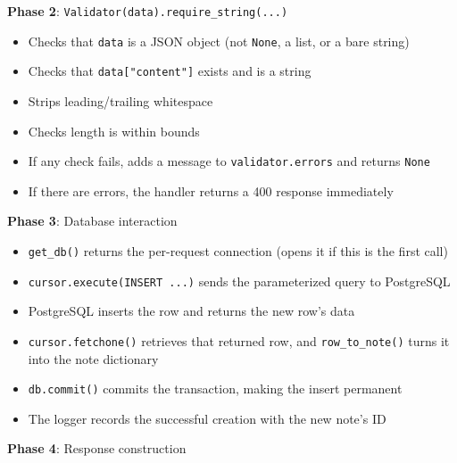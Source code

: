 \noindent{}\textbf{Phase 2}: \texttt{Validator(data).}\allowbreak{}\texttt{require\_}\allowbreak{}\texttt{string(.}\allowbreak{}\texttt{.}\allowbreak{}\texttt{.}\allowbreak{}\texttt{)}

\begin{itemize}
\tightlist
\item
  Checks that \texttt{data} is a JSON object (not \texttt{None}, a list, or a bare string)
\item
  Checks that \texttt{data{[}"content"{]}} exists and is a string
\item
  Strips leading/trailing whitespace
\item
  Checks length is within bounds
\item
  If any check fails, adds a message to \texttt{validator.errors} and returns \texttt{None}
\item
  If there are errors, the handler returns a 400 response immediately
\end{itemize}

\noindent{}\textbf{Phase 3}: Database interaction

\begin{itemize}
\tightlist
\item
  \texttt{get\_db()} returns the per-request connection (opens it if this is the first call)
\item
  \texttt{cursor.}\allowbreak{}\texttt{execute(INSERT\ .}\allowbreak{}\texttt{.}\allowbreak{}\texttt{.}\allowbreak{}\texttt{)} sends the parameterized query to PostgreSQL
\item
  PostgreSQL inserts the row and returns the new row's data
\item
  \texttt{cursor.fetchone()} retrieves that returned row, and \texttt{row\_to\_note()} turns it into the note dictionary
\item
  \texttt{db.commit()} commits the transaction, making the insert permanent
\item
  The logger records the successful creation with the new note's ID
\end{itemize}

\noindent{}\textbf{Phase 4}: Response construction


